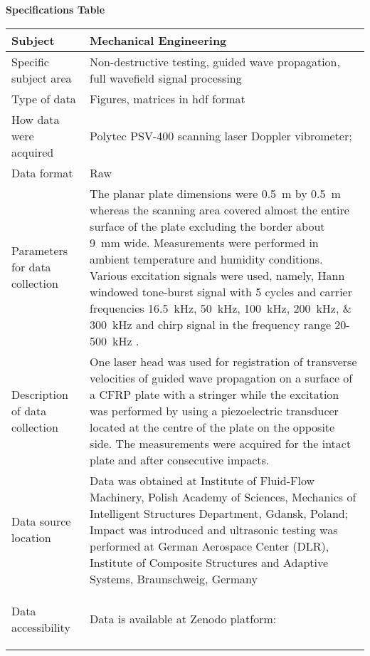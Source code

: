 \documentclass[times,final]{elsarticle}
\begin{document}
{\fontsize{7.5pt}{9pt}\selectfont
\noindent\textbf{Specifications Table} \\
 
\begin{longtable}{|p{33mm}|p{94mm}|}
\hline
\endhead
\hline
\endfoot
Subject                & Mechanical Engineering\\
\hline                         
Specific subject area  & Non-destructive testing, guided wave propagation, full wavefield signal processing\\
\hline
Type of data           &  Figures, matrices in hdf format
                         \\             
How data were acquired & Polytec PSV-400 scanning laser Doppler vibrometer; \\
\hline                         
Data format            & Raw
                         \\
\hline                         
Parameters for data\newline 
collection             & The planar plate dimensions were \SI{0.5}{\meter} by \SI{0.5}{\meter} whereas the scanning area covered almost the entire surface of the plate excluding the border about \SI{9}{\milli\meter} wide. Measurements were performed in ambient temperature and humidity conditions. Various excitation signals were used, namely, Hann windowed tone-burst signal with \num{5} cycles and carrier frequencies \SIlist{16.5;50;100;200;300}{\kilo\hertz} and chirp signal in the frequency range \num{20}-\SI{500}{\kilo\hertz} .\\  

\hline
Description of          
data\newline 
collection             & One laser head was used for registration of transverse velocities of guided wave propagation on a surface of a CFRP plate with a stringer while the excitation was performed by using a piezoelectric transducer located at the centre of the plate on the opposite side. The measurements were acquired for the intact plate and after consecutive impacts. \\
\hline                         
Data source location   & Data was obtained at Institute of Fluid-Flow Machinery, Polish Academy of Sciences, Mechanics of Intelligent Structures Department, Gdansk, Poland; Impact was introduced and ultrasonic testing was performed at German Aerospace Center (DLR), Institute of Composite Structures and Adaptive Systems, Braunschweig, Germany
 \\
\hline                         
\hypertarget{target1}
{Data accessibility}   & Data is available at Zenodo platform:  
    

\end{longtable}}
\end{document}
